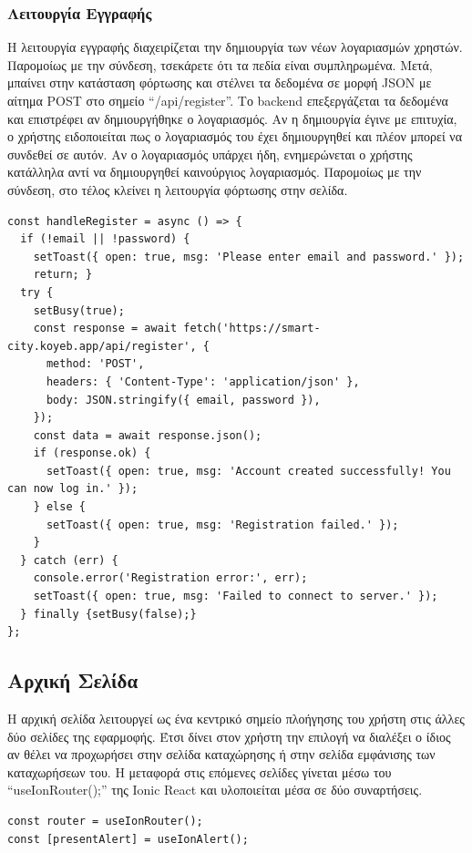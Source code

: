 \subsubsection*{Λειτουργία Εγγραφής}
Η λειτουργία εγγραφής διαχειρίζεται την δημιουργία των νέων λογαριασμών χρηστών. Παρομοίως με την σύνδεση, τσεκάρετε ότι τα πεδία είναι συμπληρωμένα. Μετά, μπαίνει στην κατάσταση φόρτωσης και στέλνει τα δεδομένα σε μορφή JSON με αίτημα POST στο σημείο “/api/register”. Το backend επεξεργάζεται τα δεδομένα και επιστρέφει αν δημιουργήθηκε ο λογαριασμός. Αν η δημιουργία έγινε με επιτυχία, ο χρήστης ειδοποιείται πως ο λογαριασμός του έχει δημιουργηθεί και πλέον μπορεί να συνδεθεί σε αυτόν. Αν ο λογαριασμός υπάρχει ήδη, ενημερώνεται ο χρήστης κατάλληλα αντί να δημιουργηθεί καινούργιος λογαριασμός. Παρομοίως με την σύνδεση, στο τέλος κλείνει η λειτουργία φόρτωσης στην σελίδα.
\\
\begin{lstlisting}
const handleRegister = async () => {
  if (!email || !password) {
    setToast({ open: true, msg: 'Please enter email and password.' });
    return; }
  try {
    setBusy(true);
    const response = await fetch('https://smart-city.koyeb.app/api/register', {
      method: 'POST',
      headers: { 'Content-Type': 'application/json' },
      body: JSON.stringify({ email, password }),
    });
    const data = await response.json();
    if (response.ok) {
      setToast({ open: true, msg: 'Account created successfully! You can now log in.' });
    } else {
      setToast({ open: true, msg: 'Registration failed.' });
    }
  } catch (err) {
    console.error('Registration error:', err);
    setToast({ open: true, msg: 'Failed to connect to server.' });
  } finally {setBusy(false);}
};
\end{lstlisting}

\subsection{Αρχική Σελίδα}

Η αρχική σελίδα λειτουργεί ως ένα κεντρικό σημείο πλοήγησης του χρήστη στις άλλες δύο σελίδες της εφαρμοφής. Έτσι δίνει στον χρήστη την επιλογή να διαλέξει ο ίδιος αν θέλει να προχωρήσει στην σελίδα καταχώρησης ή στην σελίδα εμφάνισης των καταχωρήσεων του. Η μεταφορά στις επόμενες σελίδες γίνεται μέσω του “useIonRouter();” της Ionic React και υλοποιείται μέσα σε δύο συναρτήσεις.
\\
\begin{lstlisting}
const router = useIonRouter();
const [presentAlert] = useIonAlert();
\end{lstlisting}

